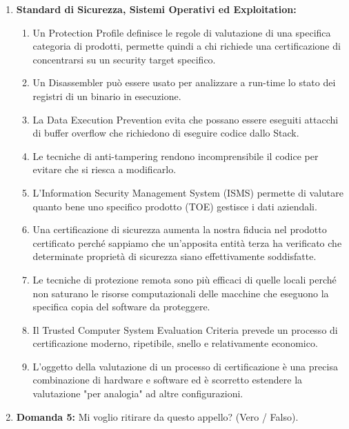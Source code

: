 \documentclass[11pt,a4paper]{article}
\begin{document}
\begin{questionbox}
\begin{enumerate}[label=\textbf{1.\arabic*}]
    \item \textbf{Standard di Sicurezza, Sistemi Operativi ed Exploitation:}
    \begin{enumerate}[label=\alph*.]
        \item Un Protection Profile definisce le regole di valutazione di una specifica categoria di prodotti, permette quindi a chi richiede una certificazione di concentrarsi su un security target specifico.
        \item Un Disassembler pu\`o essere usato per analizzare a run-time lo stato dei registri di un binario in esecuzione.
        \item La Data Execution Prevention evita che possano essere eseguiti attacchi di buffer overflow che richiedono di eseguire codice dallo Stack.
        \item Le tecniche di anti-tampering rendono incomprensibile il codice per evitare che si riesca a modificarlo.
        \item L'Information Security Management System (ISMS) permette di valutare quanto bene uno specifico prodotto (TOE) gestisce i dati aziendali.
        \item Una certificazione di sicurezza aumenta la nostra fiducia nel prodotto certificato perch\'e sappiamo che un'apposita entit\`a terza ha verificato che determinate propriet\`a di sicurezza siano effettivamente soddisfatte.
        \item Le tecniche di protezione remota sono pi\`u efficaci di quelle locali perch\'e non saturano le risorse computazionali delle macchine che eseguono la specifica copia del software da proteggere.
        \item Il Trusted Computer System Evaluation Criteria prevede un processo di certificazione moderno, ripetibile, snello e relativamente economico.
        \item L'oggetto della valutazione di un processo di certificazione \`e una precisa combinazione di hardware e software ed \`e scorretto estendere la valutazione "per analogia" ad altre configurazioni.
    \end{enumerate}

    \item \textbf{Domanda 5:}
    Mi voglio ritirare da questo appello? (Vero / Falso).
    

\end{enumerate}
\end{questionbox}
\end{document}
